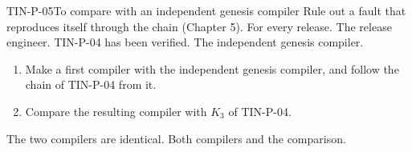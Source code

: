 \begin{AcceptanceProcedure}{TIN-P-05}{To compare with an independent genesis compiler}
Rule out a fault that reproduces itself through the chain
(Chapter 5).
For every release.
The release engineer.
TIN-P-04 has been verified.
The independent genesis compiler.
\begin{enumerate}
\item Make a first compiler with the independent genesis compiler, and
  follow the chain of TIN-P-04 from it.
\item Compare the resulting compiler with $K_3$ of TIN-P-04.
\end{enumerate}
The two compilers are identical.
Both compilers and the comparison.
\end{AcceptanceProcedure}
